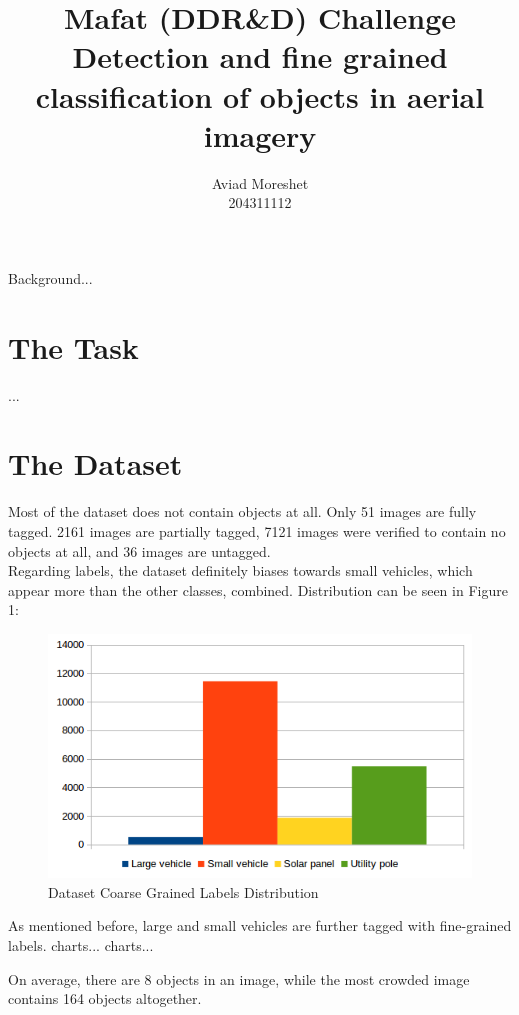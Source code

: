 \documentclass[]{article}
\title{Mafat (DDR\&D) Challenge\\
	Detection and fine grained classification of objects in aerial imagery
	}
\author{Aviad Moreshet\\204311112}
\begin{document}
\date{}
\maketitle

\begin{b}
Background...
\end{b}

\section{The Task}
...

\section{The Dataset}
Most of the dataset does not contain objects at all. Only 51 images are fully tagged. 2161 images are partially tagged, 7121 images were verified to contain no objects at all, and 36 images are untagged.\\
Regarding labels, the dataset definitely biases towards small vehicles, which appear more than the other classes, combined. Distribution can be seen in Figure 1:
\begin{figure}[!h]
\centering
\includegraphics[width=0.7\linewidth]{"charts/Dataset Coarse Grained Labels Distribution"}
\caption{Dataset Coarse Grained Labels Distribution}
\label{fig:Dataset Coarse Grained Labels Distribution}
\end{figure}

As mentioned before, large and small vehicles are further tagged with fine-grained labels.
charts...
charts...

On average, there are 8 objects in an image, while the most crowded image contains 164 objects altogether.
\end{document}
